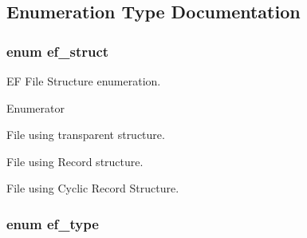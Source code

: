 \subsection{Enumeration Type Documentation}
\hypertarget{group__fs_gae0b7a8fdbb83d5bdeaf6ee5bab8054fe}{
\subsubsection[{ef\-\_\-struct}]{\setlength{\rightskip}{0pt plus 5cm}enum {\bf ef\-\_\-struct}}}\label{group__fs_gae0b7a8fdbb83d5bdeaf6ee5bab8054fe}


E\-F File Structure enumeration. 

\begin{Desc}
\item[Enumerator]\par
\begin{description}
\item[{\em 
\hypertarget{group__fs_ggae0b7a8fdbb83d5bdeaf6ee5bab8054feac719d3f34968bcf992d4c0c48841cf63}{Transparent}\label{group__fs_ggae0b7a8fdbb83d5bdeaf6ee5bab8054feac719d3f34968bcf992d4c0c48841cf63}
}]File using transparent structure. \item[{\em 
\hypertarget{group__fs_ggae0b7a8fdbb83d5bdeaf6ee5bab8054feae0da40ac190d835380202f40a9fc76eb}{Record}\label{group__fs_ggae0b7a8fdbb83d5bdeaf6ee5bab8054feae0da40ac190d835380202f40a9fc76eb}
}]File using Record structure. \item[{\em 
\hypertarget{group__fs_ggae0b7a8fdbb83d5bdeaf6ee5bab8054fea5aa1e27646a18fb490c0ff4a9b7b2f6e}{Cyclic}\label{group__fs_ggae0b7a8fdbb83d5bdeaf6ee5bab8054fea5aa1e27646a18fb490c0ff4a9b7b2f6e}
}]File using Cyclic Record Structure. \end{description}
\end{Desc}
\hypertarget{group__fs_ga6f46d6e4f39750fecff1240810793832}{
\subsubsection[{ef\-\_\-type}]{\setlength{\rightskip}{0pt plus 5cm}enum {\bf ef\-\_\-type}}}\label{group__fs_ga6f46d6e4f39750fecff1240810793832}


